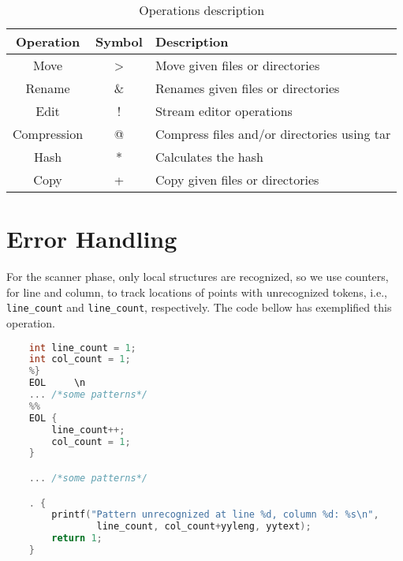 \documentclass{article}
\begin{document}
\begin{table}[ht]
    \centering
    \caption{Operations description}
    \label{tab:operations}
    \begin{tabular}{|c|c|l|} \hline
        Operation   & Symbol & Description\\ \hline
        Move        & >      & Move given files or directories \\
        Rename      & \&     & Renames given files or directories \\
        Edit        & !      & Stream editor operations \\
        Compression & @      & Compress files and/or directories using tar \\
        Hash        & *     & Calculates the hash \\
        Copy        & +     & Copy given files or directories \\ \hline
    \end{tabular}
\end{table}


\section{Error Handling}
\label{sec:error}
For the scanner phase, only local structures are recognized, so we use counters,
for line and column, to track locations of points with unrecognized tokens,
i.e., \texttt{line_count} and \texttt{line_count}, respectively. The
code bellow has exemplified this operation.

\begin{lstlisting}[language=C, caption=Example of code monitoring lines and columns.]
    %{
    int line_count = 1;
    int col_count = 1;
    %}
    EOL     \n
    ... /*some patterns*/
    %%
    EOL {
        line_count++;
        col_count = 1;
    }

    ... /*some patterns*/

    . {
        printf("Pattern unrecognized at line %d, column %d: %s\n",
                line_count, col_count+yyleng, yytext);
        return 1;
    }
\end{lstlisting}
\end{document}
